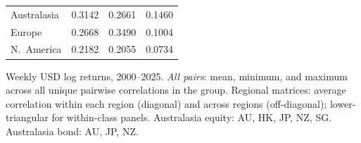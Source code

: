 \begin{table}[H]
\begin{threeparttable}
\begin{tabular}{lSSS}
\cmidrule(l){2-4}
\hspace{1em}Australasia & 0.3142 & 0.2661 & 0.1460 \\
\hspace{1em}Europe & 0.2668 & 0.3490 & 0.1004 \\
\hspace{1em}N.~America & 0.2182 & 0.2055 & 0.0734 \\
\bottomrule
\end{tabular}
\begin{tablenotes}[flushleft]
\small
\item Weekly USD log returns, 2000--2025. \textit{All pairs}: mean, minimum, and maximum across all unique pairwise correlations in the group. Regional matrices: average correlation within each region (diagonal) and across regions (off-diagonal); lower-triangular for within-class panels. Australasia equity: AU, HK, JP, NZ, SG. Australasia bond: AU, JP, NZ.
\end{tablenotes}
\end{threeparttable}
\end{table}
